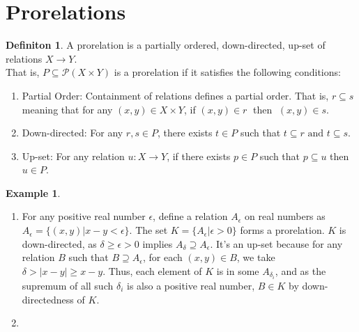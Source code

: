 \documentclass[18pt,a4paper]{article}
\theoremstyle{definition}
\newtheorem{definition}[theorem]{Definiton}
\newtheorem{ex}[theorem]{Example}
\begin{document}
		\section{Prorelations}

		\begin{definition}%
			A prorelation is a partially ordered, down-directed, up-set of relations $X \to Y$.\\
			That is, $P \subseteq \mathcal{P}(X \times Y)$ is a prorelation if it satisfies the
			following conditions:
			\begin{enumerate}[label=(\roman*)]
				\item Partial Order: Containment of relations defines a partial order.
					That is, $r \subseteq s$  meaning that for any $(x,y) \in X \times Y$,
					if  $(x,y)\in r\;$ then $\;(x,y)\in s$.
				\item Down-directed: For any $r,s \in P$, there exists $t \in P $ such that
					$t\subseteq r \text{ and } t \subseteq s$.
				\item Up-set: For any relation $u:X\to Y$, if there exists $p \in P$ such that
					$p \subseteq u $ then $u \in P$.
			\end{enumerate}
		\end{definition}

\begin{ex} %
	\begin{enumerate}[label=(\alph*)]
		\item For any positive real number $\epsilon$, define a relation $A_\epsilon$ on real numbers as
			$A_\epsilon=\{ (x,y) | x-y<\epsilon \}$. The set $K=\{A_\epsilon | \epsilon>0\}$
			forms a prorelation. $K$ is down-directed, as $\delta \geq \epsilon > 0$
			implies $A_\delta \supseteq A_\epsilon$. It's an up-set because for any relation
			$B$ such that $B \supseteq A_\epsilon$, for each $(x,y)\in B$,
		we take $\delta>|x-y| \geq x-y$. Thus, each element of $K$ is in some
	$A_{\delta_i}$,	and as the supremum of all such $\delta_i$ is also a positive real number,
	$B\in K$ by down-directedness of $K$.

\item
	\end{enumerate}
\end{ex}
\end{document}
